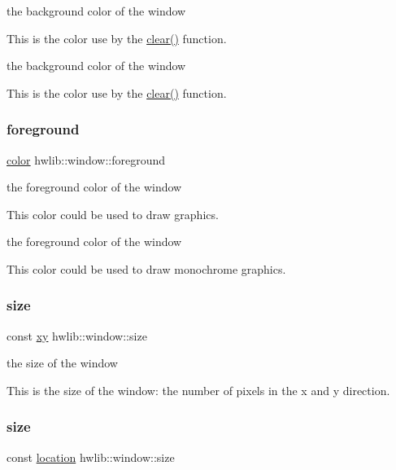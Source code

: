the background color of the window 

This is the color use by the \hyperlink{classhwlib_1_1window_a5e781163353ce26cb4dc5b2cbe40ad05}{clear()} function.

the background color of the window

This is the color use by the \hyperlink{classhwlib_1_1window_a5e781163353ce26cb4dc5b2cbe40ad05}{clear()} function. \mbox{\label{classhwlib_1_1window_a812e3bf440309bf3280d34fa04eeb718}} 
\subsubsection{\texorpdfstring{foreground}{foreground}}
{\footnotesize\ttfamily \hyperlink{classhwlib_1_1color}{color} hwlib\+::window\+::foreground}



the foreground color of the window 

This color could be used to draw graphics.

the foreground color of the window

This color could be used to draw monochrome graphics. \mbox{\label{classhwlib_1_1window_a4bcb3ccedcd692af6760c3dcb332c659}} 
\subsubsection{\texorpdfstring{size}{size}\hspace{0.1cm}{\footnotesize\ttfamily [1/2]}}
{\footnotesize\ttfamily const \hyperlink{classhwlib_1_1xy}{xy} hwlib\+::window\+::size}

the size of the window

This is the size of the window\+: the number of pixels in the x and y direction. \mbox{\label{classhwlib_1_1window_ad2ad5281c9c09d18010b19cb807d3eaa}} 
\subsubsection{\texorpdfstring{size}{size}\hspace{0.1cm}{\footnotesize\ttfamily [2/2]}}
{\footnotesize\ttfamily const \hyperlink{classhwlib_1_1location}{location} hwlib\+::window\+::size}



